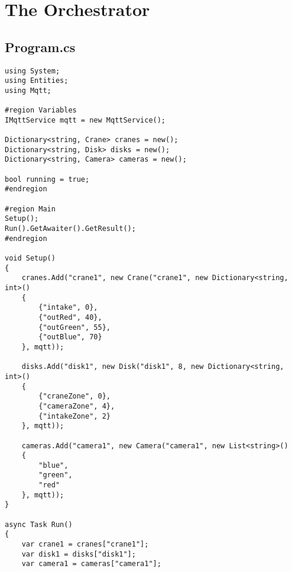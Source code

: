 \section{The Orchestrator}\label{appendix:orchestrator}

\subsection{Program.cs}

\begin{verbatim}
using System;
using Entities;
using Mqtt;

#region Variables
IMqttService mqtt = new MqttService();

Dictionary<string, Crane> cranes = new();
Dictionary<string, Disk> disks = new();
Dictionary<string, Camera> cameras = new();

bool running = true;
#endregion

#region Main
Setup();
Run().GetAwaiter().GetResult();
#endregion

void Setup()
{
    cranes.Add("crane1", new Crane("crane1", new Dictionary<string, int>()
    {
        {"intake", 0},
        {"outRed", 40},
        {"outGreen", 55},
        {"outBlue", 70}
    }, mqtt));

    disks.Add("disk1", new Disk("disk1", 8, new Dictionary<string, int>()
    {
        {"craneZone", 0},
        {"cameraZone", 4},
        {"intakeZone", 2}
    }, mqtt));

    cameras.Add("camera1", new Camera("camera1", new List<string>()
    {
        "blue",
        "green",
        "red"
    }, mqtt));
}

async Task Run()
{
    var crane1 = cranes["crane1"];
    var disk1 = disks["disk1"];
    var camera1 = cameras["camera1"];


\end{verbatim}
